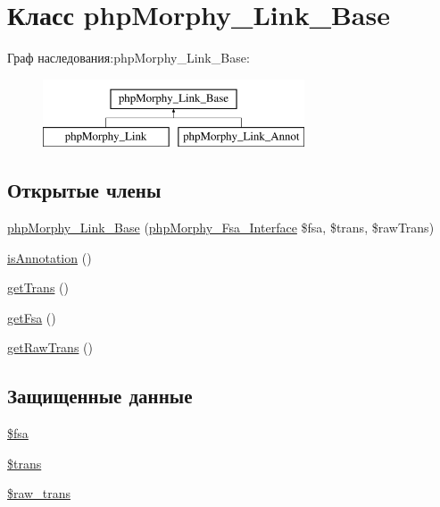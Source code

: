 \hypertarget{classphpMorphy__Link__Base}{
\section{Класс phpMorphy\_\-Link\_\-Base}
\label{classphpMorphy__Link__Base}
}
Граф наследования:phpMorphy\_\-Link\_\-Base:\begin{figure}[H]
\begin{center}
\leavevmode
\includegraphics[height=2.000000cm]{classphpMorphy__Link__Base}
\end{center}
\end{figure}
\subsection*{Открытые члены}
\begin{DoxyCompactItemize}
\item 
\hyperlink{classphpMorphy__Link__Base_ad4aaf14a5f15514651a2482e5a3513d7}{phpMorphy\_\-Link\_\-Base} (\hyperlink{interfacephpMorphy__Fsa__Interface}{phpMorphy\_\-Fsa\_\-Interface} \$fsa, \$trans, \$rawTrans)
\item 
\hyperlink{classphpMorphy__Link__Base_a8311c546e0c9912aad83d9cbefe99d5c}{isAnnotation} ()
\item 
\hyperlink{classphpMorphy__Link__Base_a4ab8a6592b93c14871012a5ee2923580}{getTrans} ()
\item 
\hyperlink{classphpMorphy__Link__Base_a0482cee0d3d9b15981594c0b3ec5cbb6}{getFsa} ()
\item 
\hyperlink{classphpMorphy__Link__Base_afca4fdfe85ba92033d190f545ff2c05e}{getRawTrans} ()
\end{DoxyCompactItemize}
\subsection*{Защищенные данные}
\begin{DoxyCompactItemize}
\item 
\hyperlink{classphpMorphy__Link__Base_a920f7335f125f823a1f9062194caac9f}{\$fsa}
\item 
\hyperlink{classphpMorphy__Link__Base_a52333ff6dfa004976aa1a8fe62d3b57c}{\$trans}
\item 
\hyperlink{classphpMorphy__Link__Base_a0f846a082c2dcfa293aae76938772a62}{\$raw\_\-trans}
\end{DoxyCompactItemize}


